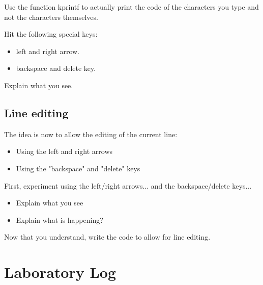 \documentclass[10]{article}
\begin{document}
Use the function kprintf to actually print the code of the
characters you type and not the characters themselves.

Hit the following special keys:

\begin{itemize}
\item left and right arrow.
\item backspace and delete key.
\end{itemize}

Explain what you see.
      
\subsection{Line editing}

The idea is now to allow the editing of the current line:

\begin{itemize}
\item Using the left and right arrows
\item Using the "backspace" and "delete" keys 
\end{itemize}

First, experiment using the left/right arrows...
and the backspace/delete keys... 

\begin{itemize}
\item Explain what you see
\item Explain what is happening?
\end{itemize}

Now that you understand, write the code to allow for line editing.

\section{Laboratory Log}
\end{document}
